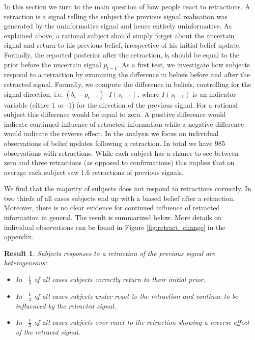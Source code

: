 \documentclass{article}
\newtheorem{result}{Result}
\newenvironment{Result}{\begin{result} \rm }{\end{result}}
\begin{document}
In this section we turn to the main question of how people react to retractions. A retraction is a signal telling the subject the previous signal realisation was generated by the uninformative signal and hence entirely uninformative. As explained above, a rational subject should simply forget about the uncertain signal and return to his previous belief, irrespective of his initial belief update. Formally, the reported posterior after the retraction, $b_t$ should be equal to the prior before the uncertain signal $p_{t-1}$. As a first test, we investigate how subjects respond to a retraction by examining the difference in beliefs before and after the retracted signal. Formally, we compute the difference in beliefs, controlling for the signal direction, i.e. $(b_t-p_{t-1}) \cdot I(s_{t-1})$, where $I(s_{t-1})$ is an indicator variable (either 1 or -1) for the direction of the previous signal. For a rational subject this difference would be equal to zero. A positive difference would indicate continued influence of retracted information while a negative difference would indicate the reverse effect. In the analysis we focus on individual observations of belief updates following a retraction. In total we have 985 observations with retractions. While each subject has a chance to see between zero and three retractions (as opposed to confirmations) this implies that on average each subject saw 1.6 retractions of previous signals. 

We find that the majority of subjects does not respond to retractions correctly. In two thirds of all cases subjects end up with a biased belief after a retraction. Moreover, there is no clear evidence for continued influence of retracted information in general. The result is summarized below. More details on individual observations can be found in Figure \ref{fig:retract_change} in the appendix.

\begin{Result}
    Subjects responses to a retraction of the previous signal are heterogeneous:
    \begin{itemize}
        \item In ~$\frac{1}{3}$ of all cases subjects correctly return to their initial prior.
        \item In ~$\frac{1}{3}$ of all cases subjects under-react to the retraction and continue to be influenced by the retracted signal.
        \item In ~$\frac{1}{3}$ of all cases subjects over-react to the retraction showing a reverse effect of the retraced signal.
    \end{itemize} 
\end{Result}
\end{document}
